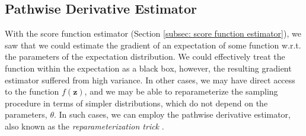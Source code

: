 \subsection{Pathwise Derivative Estimator}

With the score function estimator (Section \ref{subsec: score function estimator}), we saw that we could estimate the gradient of an expectation of some function w.r.t. the parameters of the expectation distribution. We could effectively treat the function within the expectation as a black box, however, the resulting gradient estimator suffered from high variance. In other cases, we may have direct access to the function $f(\mathbf{z})$, and we may be able to reparameterize the sampling procedure in terms of simpler distributions, which do not depend on the parameters, $\theta$. In such cases, we can employ the pathwise derivative estimator, also known as the \textit{reparameterization trick} \cite{rezende2014stochastic, kingma2013auto}.

